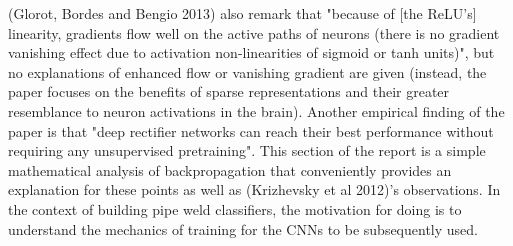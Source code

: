 \documentclass[a4paper,11pt]{article}
\begin{document}
(Glorot, Bordes and Bengio 2013) also remark that "because of [the ReLU's] linearity, gradients flow well on the active paths of neurons (there is no gradient vanishing effect due to activation non-linearities of sigmoid or tanh units)", but no explanations of enhanced flow or vanishing gradient are given (instead, the paper focuses on the benefits of sparse representations and their greater resemblance to neuron activations in the brain). Another empirical finding of the paper is that "deep rectifier networks can reach their best performance without requiring any unsupervised pretraining". This section of the report is a simple mathematical analysis of backpropagation that conveniently provides an explanation for these points as well as (Krizhevsky et al 2012)'s observations. In the context of building pipe weld classifiers, the motivation for doing is to understand the mechanics of training for the CNNs to be subsequently used. \\

\end{document}
